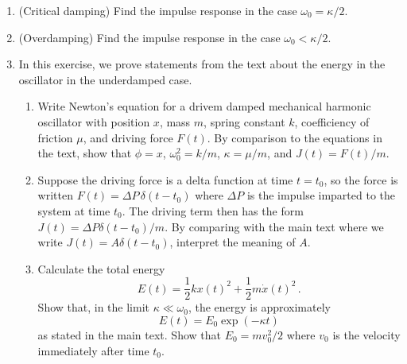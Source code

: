 

\begin{enumerate}[label=\alph*.]
  \item (Critical damping) Find the impulse response in the case $\omega_0 = \kappa / 2$.
  \item (Overdamping) Find the impulse response in the case $\omega_0 < \kappa / 2$.
  \item In this exercise, we prove statements from the text about the energy in the oscillator in the underdamped case.
    \begin{enumerate}[label=\roman*.]
      \item Write Newton's equation for a drivem damped mechanical harmonic oscillator with position $x$, mass $m$, spring constant $k$, coefficiency of friction $\mu$, and driving force $F(t)$.
        By comparison to the equations in the text, show that $\phi = x$, $\omega_0^2 = k/m$, $\kappa = \mu / m$, and $J(t) = F(t) / m$.
      \item Suppose the driving force is a delta function at time $t = t_0$, so the force is written $F(t) = \Delta P \, \delta(t - t_0)$ where $\Delta P$ is the impulse imparted to the system at time $t_0$.
        The driving term then has the form $J(t) = \Delta P \delta(t - t_0) / m$.
        By comparing with the main text where we write $J(t) = A \delta(t - t_0)$, interpret the meaning of $A$.
      \item Calculate the total energy
        \begin{equation*}
          E(t) = \frac{1}{2} k x(t)^2 + \frac{1}{2} m \dot{x}(t)^2
          \, .
        \end{equation*}
        Show that, in the limit $\kappa \ll \omega_0$, the energy is approximately
        \begin{equation*}
          E(t) = E_0 \exp \left( - \kappa t \right)
        \end{equation*}
        as stated in the main text.
        Show that $E_0 = m v_0^2 / 2$ where $v_0$ is the velocity immediately after time $t_0$.
    \end{enumerate}
\end{enumerate}



